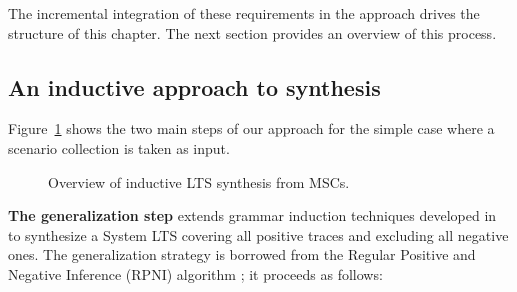The incremental integration of these requirements in the approach drives the structure of this chapter. The next section provides an overview of this process.


\subsection{An inductive approach to synthesis\label{subsection:inductive-synthesis-approach}}

Figure~\ref{image:inductive-synthesis-overview} shows the two main steps of our approach for the simple case where a scenario collection is taken as input. 

\begin{figure}[h]
\centering
{}
\caption{Overview of inductive LTS synthesis from MSCs.\label{image:inductive-synthesis-overview}}
\end{figure}

\noindent \textbf{The generalization step} extends grammar induction techniques developed in \cite{Oncina:1992} to synthesize a System LTS covering all positive traces and excluding all negative ones. The generalization strategy is borrowed from the Regular Positive and Negative Inference (RPNI) algorithm \cite{Oncina:1992}; it proceeds as follows:

